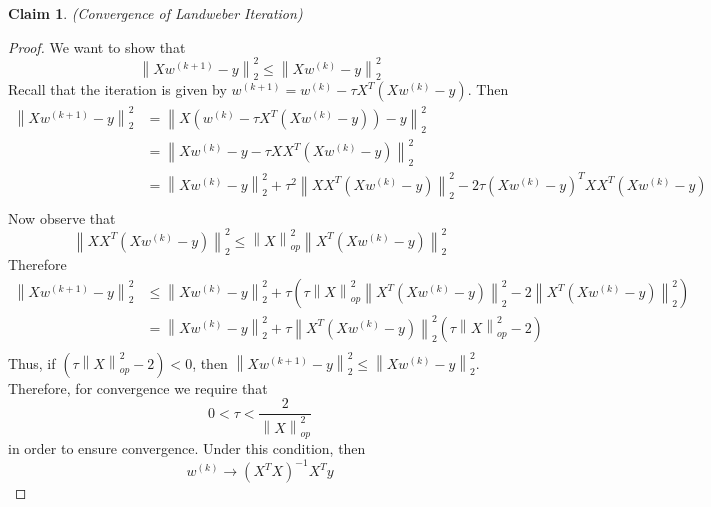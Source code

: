 \documentclass[12pt]{article}
\newtheorem{claim}{Claim}
\theoremstyle{definition}
\newcommand{\norm}[1]{\left\lVert#1\right\rVert}
\begin{document}
\begin{claim}(Convergence of Landweber Iteration)

\end{claim}
\begin{proof}
We want to show that
\begin{equation}
	\norm{Xw^{(k+1)} - y}^2_2 \leq \norm{Xw^{(k)} - y}^2_2
\end{equation}
Recall that the iteration is given by $w^{(k+1)} = w^{(k)} - \tau X^T(Xw^{(k)} - y)$. Then
\begin{align*}
	\norm{Xw^{(k+1)} - y}^2_2 &= \norm{X(w^{(k)} - \tau X^T(Xw^{(k)} - y)) - y}^2_2 \\
	&= \norm{Xw^{(k)} - y - \tau XX^T(Xw^{(k)} - y)}^2_2 \\
	&= \norm{Xw^{(k)} - y}^2_2 + \tau^2 \norm{XX^T(Xw^{(k)} - y)}^2_2 - 2\tau(Xw^{(k)} - y)^T X X^T (Xw^{(k)} - y) \\
\end{align*}
Now observe that
\begin{equation}
	\norm{XX^T(Xw^{(k)} - y)}^2_2 \leq \norm{X}^2_{op} \norm{X^T(Xw^{(k)} - y)}^2_2
\end{equation}
Therefore 
\begin{align*}
	\norm{Xw^{(k+1)} - y}^2_2 &\leq \norm{Xw^{(k)} - y}^2_2 + \tau\left(\tau \norm{X}^2_{op} \norm{X^T(Xw^{(k)} - y)}^2_2 - 2 \norm{X^T(Xw^{(k)} - y)}^2_2\right) \\
	&= \norm{Xw^{(k)} - y}^2_2 + \tau \norm{X^T(Xw^{(k)} - y)}^2_2(\tau \norm{X}^2_{op} - 2) \\
\end{align*}
Thus, if $(\tau \norm{X}^2_{op} - 2) < 0$, then $\norm{Xw^{(k+1)} - y}^2_2 \leq \norm{Xw^{(k)} - y}^2_2$. Therefore, for convergence we require that
\begin{equation}
	0 < \tau < \frac{2}{\norm{X}^2_{op}}
\end{equation}
in order to ensure convergence. Under this condition, then
\begin{equation}
	w^{(k)} \to (X^T X)^{-1}X^T y
\end{equation}
\end{proof}
\end{document}
